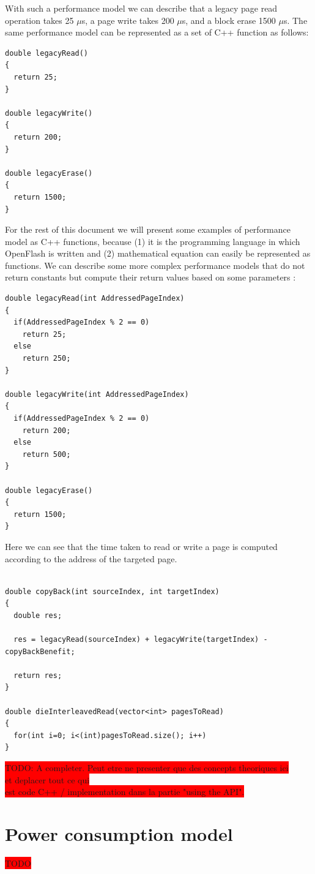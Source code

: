 With such a performance model we can describe that a legacy page read operation takes 25 $\mu$s, a page write takes 200 $\mu$s, and a block erase 1500 $\mu$s. The same performance model can be represented as a set of C++ function as follows:

\begin{lstlisting}
double legacyRead()
{
  return 25;
}

double legacyWrite()
{
  return 200;
}

double legacyErase()
{
  return 1500;
}
\end{lstlisting}

For the rest of this document we will present some examples of performance model as C++ functions, because (1) it is the programming language in which OpenFlash is written and (2) mathematical equation can easily be represented as functions. We can describe some more complex performance models that do not return constants but compute their return values based on some parameters :

\begin{lstlisting}
double legacyRead(int AddressedPageIndex)
{
  if(AddressedPageIndex % 2 == 0)
    return 25;
  else
    return 250;
}

double legacyWrite(int AddressedPageIndex)
{
  if(AddressedPageIndex % 2 == 0)
    return 200;
  else
    return 500;
}

double legacyErase()
{
  return 1500;
}

\end{lstlisting}

Here we can see that the time taken to read or write a page is computed according to the address of the targeted page.

\begin{lstlisting}

double copyBack(int sourceIndex, int targetIndex)
{
  double res;
  
  res = legacyRead(sourceIndex) + legacyWrite(targetIndex) - copyBackBenefit;
  
  return res;
}

double dieInterleavedRead(vector<int> pagesToRead)
{
  for(int i=0; i<(int)pagesToRead.size(); i++)
}
\end{lstlisting}

\colorbox{red}{TODO: A completer. Peut etre ne presenter que des concepts theoriques ici}\\
\colorbox{red}{et deplacer tout ce qui \\est code C++ / implementation dans la partie "using the API".}
  
  \section{Power consumption model}

\colorbox{red}{TODO}
